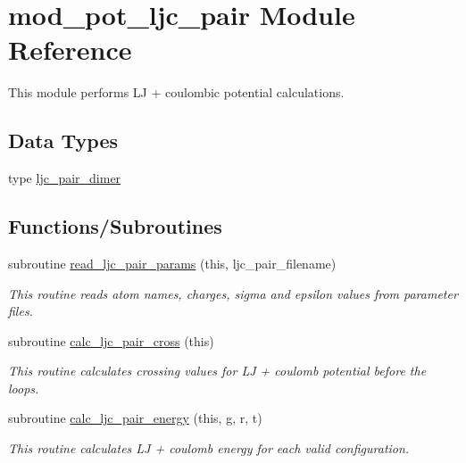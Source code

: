 \hypertarget{namespacemod__pot__ljc__pair}{}\section{mod\+\_\+pot\+\_\+ljc\+\_\+pair Module Reference}
\label{namespacemod__pot__ljc__pair}


This module performs LJ + coulombic potential calculations.  


\subsection*{Data Types}
\begin{DoxyCompactItemize}
\item 
type \hyperlink{structmod__pot__ljc__pair_1_1ljc__pair__dimer}{ljc\+\_\+pair\+\_\+dimer}
\end{DoxyCompactItemize}
\subsection*{Functions/\+Subroutines}
\begin{DoxyCompactItemize}
\item 
subroutine \hyperlink{namespacemod__pot__ljc__pair_a0e073ba5b680fbad3e66c6119a8b0a00}{read\+\_\+ljc\+\_\+pair\+\_\+params} (this, ljc\+\_\+pair\+\_\+filename)
\begin{DoxyCompactList}\small\item\em This routine reads atom names, charges, sigma and epsilon values from parameter files. \end{DoxyCompactList}\item 
subroutine \hyperlink{namespacemod__pot__ljc__pair_ae2cc8a028ca8c5488be8c934dec21f61}{calc\+\_\+ljc\+\_\+pair\+\_\+cross} (this)
\begin{DoxyCompactList}\small\item\em This routine calculates crossing values for LJ + coulomb potential before the loops. \end{DoxyCompactList}\item 
subroutine \hyperlink{namespacemod__pot__ljc__pair_ad7983df6d805852c7c2eafd29a09c7a7}{calc\+\_\+ljc\+\_\+pair\+\_\+energy} (this, g, r, t)
\begin{DoxyCompactList}\small\item\em This routine calculates LJ + coulomb energy for each valid configuration. \end{DoxyCompactList}\end{DoxyCompactItemize}

